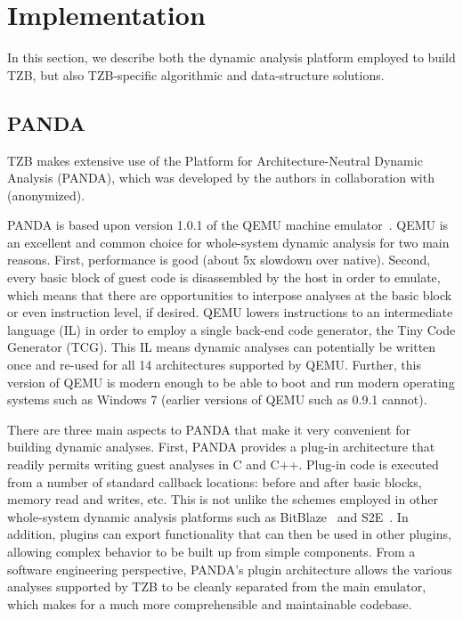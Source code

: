 \section{Implementation}
\label{sec:implementation}

In this section, we describe both the dynamic analysis platform employed to
build TZB, but also TZB-specific algorithmic and data-structure solutions.

\subsection{PANDA}
\label{sec:implementation:subsec:panda}

TZB makes extensive use of the Platform for Architecture-Neutral Dynamic
Analysis (PANDA), which was developed by the authors in collaboration
with (anonymized).

PANDA is based upon version 1.0.1 of the QEMU machine
emulator~\cite{Bellard:2005}. QEMU is an excellent and common choice for
whole-system dynamic analysis for two main reasons. First, performance
is good (about 5x slowdown over native). Second, every basic block of
guest code is disassembled by the host in order to emulate, which means
that there are opportunities to interpose analyses at the basic block or
even instruction level, if desired. QEMU lowers instructions to an
intermediate language (IL) in order to employ a single back-end code
generator, the Tiny Code Generator (TCG). This IL means dynamic analyses
can potentially be written once and re-used for all 14 architectures
supported by QEMU. Further, this version of QEMU is modern enough to be
able to boot and run modern operating systems such as Windows 7 (earlier
versions of QEMU such as 0.9.1 cannot).

There are three main aspects to PANDA that make it very convenient for
building dynamic analyses. First, PANDA provides a plug-in architecture that
readily permits writing guest analyses in C and C++. Plug-in code is
executed from a number of standard callback locations: before and after
basic blocks, memory read and writes, etc. This is not unlike the
schemes employed in other whole-system dynamic analysis platforms such
as BitBlaze~\cite{Song:2008bitblaze} and S2E~\cite{Chipounov:2011s2e}.
In addition, plugins can export functionality that can then be used in
other plugins, allowing complex behavior to be built up from simple
components. From a software engineering perspective, PANDA's plugin
architecture allows the various analyses supported by TZB to be cleanly
separated from the main emulator, which makes for a much more
comprehensible and maintainable codebase.

